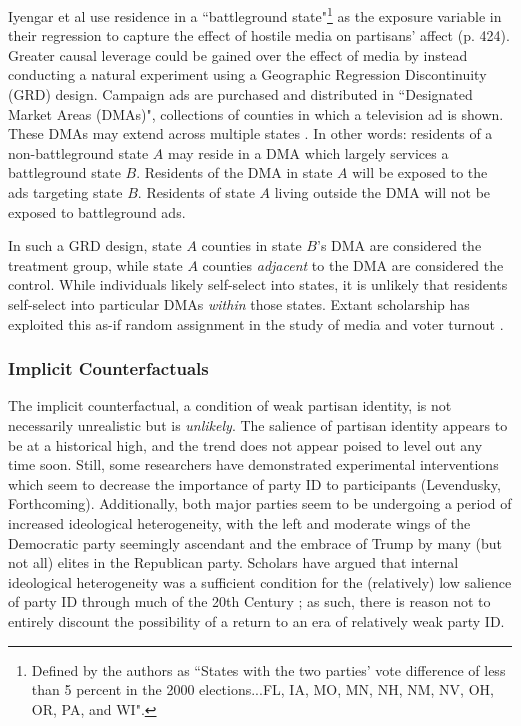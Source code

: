 \documentclass[12pt]{article}
\begin{document}
Iyengar et al use residence in a ``battleground state"\footnote{Defined by the authors as ``States with the two parties’ vote difference of less than 5 percent in the 2000 elections...FL, IA, MO, MN, NH, NM, NV, OH, OR, PA, and WI".} as the exposure variable in their regression to capture the effect of hostile media on partisans' affect (p. 424). Greater causal leverage could be gained over the effect of media by instead conducting a natural experiment using a Geographic Regression Discontinuity (GRD) design. Campaign ads are purchased and distributed in ``Designated Market Areas (DMAs)", collections of counties in which a television ad is shown. These DMAs may extend across multiple states \citep{keele2015geographic}. In other words: residents of a non-battleground state $A$ may reside in a DMA which largely services a battleground state $B$. Residents of the DMA in state $A$ will be exposed to the ads targeting state $B$. Residents of state $A$ living outside the DMA will not be exposed to battleground ads.

In such a GRD design, state $A$ counties in state $B$'s DMA are considered the treatment group, while state $A$ counties \textit{adjacent} to the DMA are considered the control. While individuals likely self-select into states, it is unlikely that residents self-select into particular DMAs \textit{within} those states. Extant scholarship has exploited this as-if random assignment in the study of media and voter turnout \cite{krasno2008televised, huber2007identifying}.








\subsubsection{Implicit Counterfactuals}
The implicit counterfactual, a condition of weak partisan identity, is not necessarily unrealistic but is \textit{unlikely}. The salience of partisan identity appears to be at a historical high, and the trend does not appear poised to level out any time soon. Still, some researchers have demonstrated experimental interventions which seem to decrease the importance of party ID to participants (Levendusky, Forthcoming). Additionally, both major parties seem to be undergoing a period of increased ideological heterogeneity, with the left and moderate wings of the Democratic party seemingly ascendant and the embrace of Trump by many (but not all) elites in the Republican party. Scholars have argued that internal ideological heterogeneity was a sufficient condition for the (relatively) low salience of party ID through much of the 20th Century \citep{rohde1991parties}; as such, there is reason not to entirely discount the possibility of a return to an era of relatively weak party ID.
\end{document}
